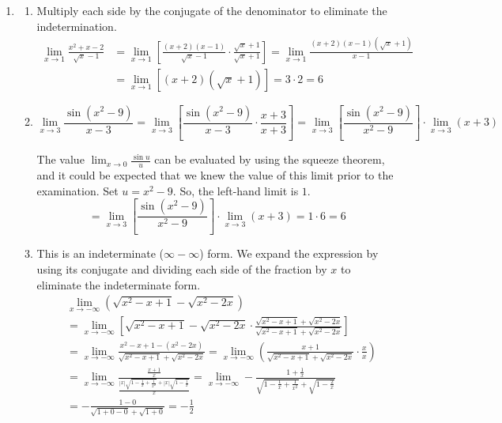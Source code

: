\documentclass[a4paper, 12pt]{article}
\begin{document}
\begin{enumerate}[leftmargin=*,label=\textbf{\arabic*.}]
\item
\begin{enumerate}[leftmargin=*,label=\textbf{\alph*.}]
\item Multiply each side by the conjugate of the denominator to eliminate the indetermination.
\begin{align*}
\lim_{x\to1}\frac{x^2+x-2}{\sqrt x -1}&=\lim_{x\to1}\left[\frac{(x+2)(x-1)}{\sqrt x -1}\cdot \frac{\sqrt x + 1}{\sqrt x +1}\right]=\lim_{x\to1}\frac{(x+2)(x-1)\left(\sqrt x + 1\right)}{x-1}\\[1em]&=\lim_{x\to1}\left[(x+2)\left(\sqrt x + 1\right)\right] =3\cdot 2 = \boxed6
\end{align*}

\item
\[\lim_{x\to 3}\frac{\sin(x^2-9)}{x-3}=\lim_{x\to 3}\left[\frac{\sin(x^2-9)}{x-3}\cdot\frac{x+3}{x+3}\right]=\lim_{x\to3}\left[\frac{\sin(x^2-9)}{x^2-9}\right]\cdot\lim_{x\to 3}(x+3)\]

The value $\displaystyle \lim_{x\to0}\frac{\sin u}{u}$ can be evaluated by using the squeeze theorem, and it could be expected that we knew the value of this limit prior to the examination. Set $u=x^2-9$. So, the left-hand limit is $1$.
\[=\lim_{x\to3}\left[\frac{\sin(x^2-9)}{x^2-9}\right]\cdot\lim_{x\to 3}(x+3) = 1\cdot 6 = \boxed6\]

\item This is an indeterminate ($\infty - \infty$) form. We expand the expression by using its conjugate and dividing each side of the fraction by $x$ to eliminate the indeterminate form.
\begin{align*}&\lim_{x\to -\infty}\left(\sqrt{x^2-x+1}-\sqrt{x^2-2x}\right)\\[1em]&=\lim_{x\to -\infty}\left[\sqrt{x^2-x+1}-\sqrt{x^2-2x}\cdot\frac{\sqrt{x^2-x+1}+\sqrt{x^2-2x}}{\sqrt{x^2-x+1}+\sqrt{x^2-2x}}\right]\\[1em]&=\lim_{x\to-\infty}\frac{x^2-x+1-\left(x^2-2x\right)}{\sqrt{x^2-x+1}+\sqrt{x^2-2x}}=\lim_{x\to-\infty}\left(\frac{x+1}{\sqrt{x^2-x+1}+\sqrt{x^2-2x}}\cdot\frac{x}{x}\right)\\[1em]&=\lim_{x\to-\infty}\frac{\displaystyle\frac{x+1}x}{\displaystyle\frac{|x|\sqrt{1-\frac1x+\frac1{x^2}}+|x|\sqrt{1-\frac1x}}x}=\lim_{x\to-\infty}-\frac{\displaystyle1+\frac{1}x}{\displaystyle\sqrt{1-\frac1x+\frac1{x^2}}+\sqrt{1-\frac2x}}\\[1em]&=-\frac{1-0}{\sqrt{1+0-0}+\sqrt{1+0}}=\boxed{-\frac12}\end{align*}
\end{enumerate}


\end{enumerate}
\end{document}
